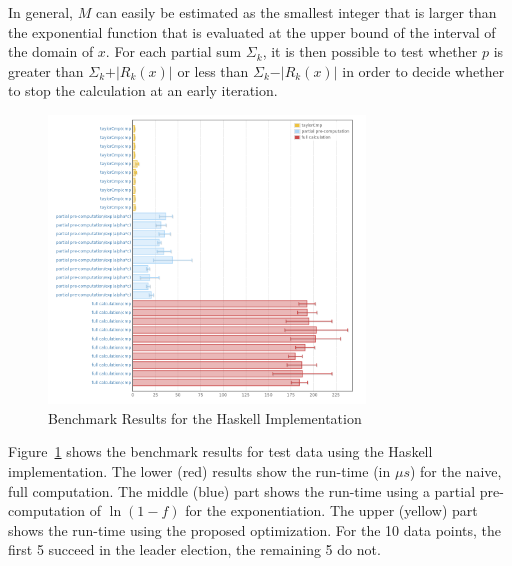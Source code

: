 \documentclass[11pt,a4paper,dvipsnames]{article}
\theoremstyle{definition}
\theoremstyle{definition}
\begin{document}
In general, $M$ can easily be estimated as the smallest
integer that is larger than the exponential function that is evaluated at
the upper bound of the interval of the domain of $x$. For each partial sum $\Sigma_{k}$, it
is then possible to test whether $p$ is greater than $\Sigma_k + \vert R_{k}(x) \vert$ or less than
$\Sigma_k - \vert R_{k}(x)\vert$ in order to decide whether to stop the calculation at an early
iteration.

\begin{figure}[ht]
  \centering
  \includegraphics[width=0.75\textwidth]{haskell.png}
  \caption{Benchmark Results for the Haskell Implementation}
  \label{fig:haskell-optimization-results}
\end{figure}

Figure~\ref{fig:haskell-optimization-results} shows the benchmark results for
test data using the Haskell implementation. The lower (red) results show the
run-time (in $\mu s$) for the naive, full computation. The middle (blue) part
shows the run-time using a partial pre-computation of $\ln (1-f)$ for the
exponentiation. The upper (yellow) part shows the run-time using the proposed
optimization. For the 10 data points, the first 5 succeed in the leader
election, the remaining 5 do not.

% 


\end{document}
